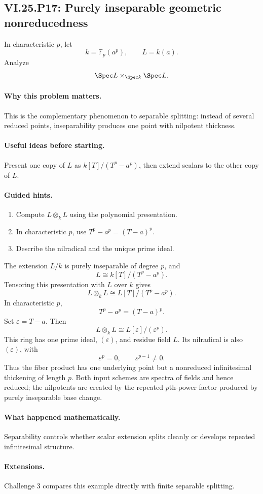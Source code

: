 \subsection*{VI.25.P17: Purely inseparable geometric nonreducedness}
\begin{problem}\label{prob:vi25-p17}
In characteristic \(p\), let
\[
k=\mathbb F_p(a^p),\qquad L=k(a).
\]
Analyze
\[
\Spec L\times_{\Spec k}\Spec L.
\]
\end{problem}

\ifdefined\FullProblemDossiers
\paragraph{Why this problem matters.}
This is the complementary phenomenon to separable splitting: instead of several reduced points, inseparability produces one point with nilpotent thickness.

\paragraph{Useful ideas before starting.}
Present one copy of \(L\) as \(k[T]/(T^p-a^p)\), then extend scalars to the other copy of \(L\).

\paragraph{Guided hints.}
\begin{enumerate}
\item Compute \(L\otimes_kL\) using the polynomial presentation.
\item In characteristic \(p\), use \(T^p-a^p=(T-a)^p\).
\item Describe the nilradical and the unique prime ideal.
\end{enumerate}

\begin{solution}
The extension \(L/k\) is purely inseparable of degree \(p\), and
\[
L\cong k[T]/(T^p-a^p).
\]
Tensoring this presentation with \(L\) over \(k\) gives
\[
L\otimes_kL
\cong
L[T]/(T^p-a^p).
\]
In characteristic \(p\),
\[
T^p-a^p=(T-a)^p.
\]
Set \(\varepsilon=T-a\).  Then
\[
L\otimes_kL\cong L[\varepsilon]/(\varepsilon^p).
\]
This ring has one prime ideal, \((\varepsilon)\), and residue field \(L\).  Its nilradical is also \((\varepsilon)\), with
\[
\varepsilon^p=0,\qquad \varepsilon^{p-1}\ne0.
\]
Thus the fiber product has one underlying point but a nonreduced infinitesimal thickening of length \(p\).  Both input schemes are spectra of fields and hence reduced; the nilpotents are created by the repeated \(p\)th-power factor produced by purely inseparable base change.
\end{solution}

\paragraph{What happened mathematically.}
Separability controls whether scalar extension splits cleanly or develops repeated infinitesimal structure.

\paragraph{Extensions.}
Challenge 3 compares this example directly with finite separable splitting.
\fi
